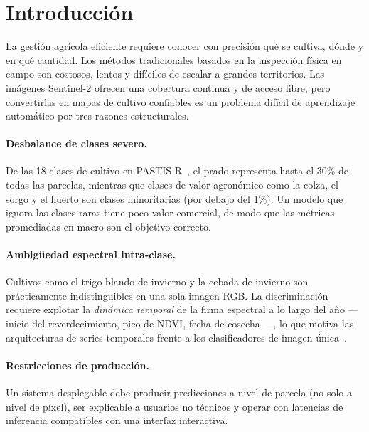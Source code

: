 \section{Introducción}
\label{sec:intro}

La gestión agrícola eficiente requiere conocer con precisión qué se
cultiva, dónde y en qué cantidad. Los métodos tradicionales basados en
la inspección física en campo son costosos, lentos y difíciles de
escalar a grandes territorios. Las imágenes Sentinel-2 ofrecen una
cobertura continua y de acceso libre, pero convertirlas en mapas de
cultivo confiables es un problema difícil de aprendizaje automático por
tres razones estructurales.

\paragraph{Desbalance de clases severo.}
De las 18 clases de cultivo en PASTIS-R~\cite{garnot2021pastis}, el
prado representa hasta el 30\% de todas las parcelas, mientras que
clases de valor agronómico como la colza, el sorgo y el huerto son
clases minoritarias (por debajo del 1\%). Un modelo que ignora las
clases raras tiene poco valor comercial, de modo que las métricas
promediadas en macro son el objetivo correcto.

\paragraph{Ambigüedad espectral intra-clase.}
Cultivos como el trigo blando de invierno y la cebada de invierno son
prácticamente indistinguibles en una sola imagen RGB. La discriminación
requiere explotar la \emph{dinámica temporal} de la firma espectral a lo
largo del año --- inicio del reverdecimiento, pico de NDVI, fecha de
cosecha ---, lo que motiva las arquitecturas de series temporales frente
a los clasificadores de imagen
única~\cite{tarasiou2023tsvit,garnot2021utae}.

\paragraph{Restricciones de producción.}
Un sistema desplegable debe producir predicciones a nivel de parcela (no
solo a nivel de píxel), ser explicable a usuarios no técnicos y operar
con latencias de inferencia compatibles con una interfaz interactiva.

